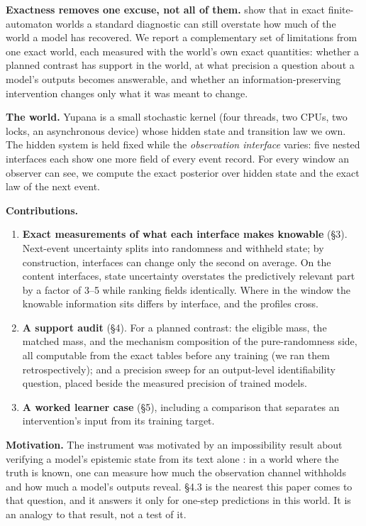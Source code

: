 \documentclass[10pt]{article}
\providecommand{\tightlist}{\setlength{\itemsep}{0pt}\setlength{\parskip}{0pt}}
\begin{document}
\textbf{Exactness removes one excuse, not all of them.} \citet{vafa2024world} show that in exact finite-automaton worlds a standard
diagnostic can still overstate how much of the world a model has recovered. We report a complementary set of
limitations from one exact world, each measured with the world's own exact quantities: whether a planned contrast has
support in the world, at what precision a question about a model's outputs becomes answerable, and whether an
information-preserving intervention changes only what it was meant to change.

\textbf{The world.} Yupana is a small stochastic kernel (four threads, two CPUs, two locks, an asynchronous device) whose
hidden state and transition law we own. The hidden system is held fixed while the \emph{observation interface} varies: five
nested interfaces each show one more field of every event record. For every window an observer can see, we compute
the exact posterior over hidden state and the exact law of the next event.

\textbf{Contributions.}

\begin{enumerate}
\def\labelenumi{\arabic{enumi}.}
\tightlist
\item
  \textbf{Exact measurements of what each interface makes knowable} (§3). Next-event uncertainty splits into randomness and
  withheld state; by construction, interfaces can change only the second on average. On the content interfaces, state uncertainty
  overstates the predictively relevant part by a factor of 3--5 while ranking fields identically. Where in the window
  the knowable information sits differs by interface, and the profiles cross.
\item
  \textbf{A support audit} (§4). For a planned contrast: the eligible mass, the matched mass, and the mechanism
  composition of the pure-randomness side, all computable from the exact tables before any training (we ran them retrospectively); and a
  precision sweep for an output-level identifiability question, placed beside the measured precision of trained
  models.
\item
  \textbf{A worked learner case} (§5), including a comparison that separates an intervention's input from its training
  target.
\end{enumerate}

\textbf{Motivation.} The instrument was motivated by an impossibility result about verifying a model's epistemic state from
its text alone \citep{epistemic2026observability}: in a world where the truth is known, one can measure how much the observation
channel withholds and how much a model's outputs reveal. §4.3 is the nearest this paper comes to that question, and it
answers it only for one-step predictions in this world. It is an analogy to that result, not a test of it.
\end{document}
